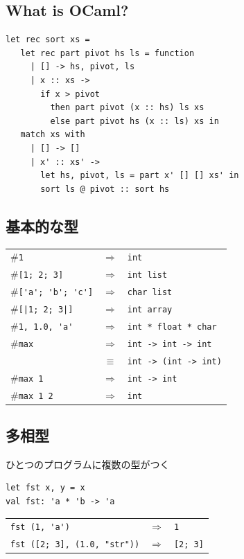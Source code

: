 \documentclass[papersize,30pt,slide]{jsarticle}
\begin{document}
\subsection*{\thesubsection\quad What is OCaml?}
\begin{lstlisting}
let rec sort xs =
   let rec part pivot hs ls = function
     | [] -> hs, pivot, ls
     | x :: xs ->
       if x > pivot
         then part pivot (x :: hs) ls xs
         else part pivot hs (x :: ls) xs in
   match xs with
     | [] -> []
     | x' :: xs' ->
       let hs, pivot, ls = part x' [] [] xs' in
       sort ls @ pivot :: sort hs
\end{lstlisting}


\newpage
\subsection{基本的な型}
\begin{tabular}{lcl}
\#\lstinline|1| &$\Longrightarrow$& \lstinline|int|\\
\#\lstinline|[1; 2; 3]| &$\Longrightarrow$& \lstinline|int list|\\
\#\lstinline|['a'; 'b'; 'c']| &$\Longrightarrow$& \lstinline|char list|\\
\#\lstinline![|1; 2; 3|]! &$\Longrightarrow$& \lstinline|int array|\\
\#\lstinline|1, 1.0, 'a'| &$\Longrightarrow$& \lstinline|int * float * char| \\
\#\lstinline|max| &$\Longrightarrow$& \lstinline|int -> int -> int|\\
                &$\equiv$& \lstinline|int -> (int -> int)| \\
\#\lstinline|max 1| &$\Longrightarrow$& \lstinline|int -> int|\\
\#\lstinline|max 1 2| &$\Longrightarrow$& \lstinline|int|\\
\end{tabular}

\newpage
\subsection{多相型}
ひとつのプログラムに複数の型がつく

\begin{lstlisting}
let fst x, y = x
val fst: 'a * 'b -> 'a
\end{lstlisting}
\begin{tabular}{lcl}
\lstinline|fst (1, 'a')| &$\Longrightarrow$& \lstinline|1|\\
\lstinline|fst ([2; 3], (1.0, "str"))| &$\Longrightarrow$&
	 \lstinline|[2; 3]|
\end{tabular}
\end{document}
